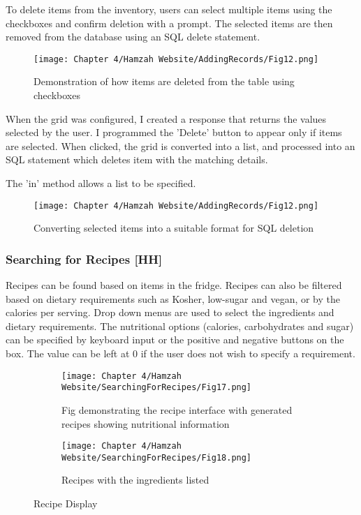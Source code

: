To delete items from the inventory, users can select multiple items using the checkboxes and confirm deletion with a prompt.
The selected items are then removed from the database using an SQL delete statement.



\begin{figure}[H]        
    \centering
    \texttt{[image: Chapter 4/Hamzah Website/AddingRecords/Fig12.png]}
    \caption{Demonstration of how items are deleted from the table using checkboxes}
\end{figure} 

When the grid was configured, I created a response that returns the values selected by the user.
I programmed the 'Delete' button to appear only if items are selected.
When clicked, the grid is converted into a list, and processed into an SQL statement which deletes item with the matching details.

The 'in' method allows a list to be specified.

\begin{figure}[H]        
    \centering
    \texttt{[image: Chapter 4/Hamzah Website/AddingRecords/Fig12.png]}
    \caption{Converting selected items into a suitable format for SQL deletion}
\end{figure} 

\subsubsection{Searching for Recipes [HH]}

Recipes can be found based on items in the fridge.
Recipes can also be filtered based on dietary requirements such as Kosher, low-sugar and vegan, or by the calories per serving.
Drop down menus are used to select the ingredients and dietary requirements.
The nutritional options (calories, carbohydrates and sugar) can be specified by keyboard input or the positive and negative buttons on the box.
The  value can be left at 0 if the user does not wish to specify a requirement.

\begin{figure}[H]
    \begin{subfigure}{.5\textwidth}
        \centering
        \texttt{[image: Chapter 4/Hamzah Website/SearchingForRecipes/Fig17.png]}
        \caption{Fig demonstrating the recipe interface with generated recipes showing nutritional information}
    \end{subfigure}%
    \begin{subfigure}{.5\textwidth}
        \centering
        \texttt{[image: Chapter 4/Hamzah Website/SearchingForRecipes/Fig18.png]}
        \caption{Recipes with the ingredients listed}
    \end{subfigure}
    \caption{Recipe Display}
\end{figure}

